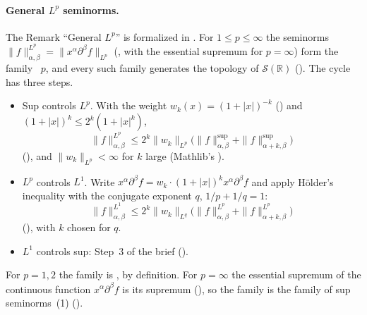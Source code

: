 \documentclass[11pt]{article}
\begin{document}
\paragraph{General $L^p$ seminorms.} The Remark ``General $L^p$'' is formalized in
. For $1 \le p \le \infty$ the seminorms
$\|f\|^{L^p}_{\alpha,\beta} = \|x^\alpha \partial^\beta f\|_{L^p}$ (, with the
essential supremum for $p = \infty$) form the family ~$p$, and every such family
generates the topology of $\mathcal{S}(\mathbb{R})$ (). The cycle has
three steps.
\begin{itemize}
\item Sup controls $L^p$. With the weight $w_k(x) = (1+|x|)^{-k}$ () and
  $(1+|x|)^k \le 2^k(1+|x|^k)$,
  \[
    \|f\|^{L^p}_{\alpha,\beta} \le 2^k \|w_k\|_{L^p}
      \bigl(\|f\|^{\sup}_{\alpha,\beta} + \|f\|^{\sup}_{\alpha+k,\beta}\bigr)
  \]
  (), and $\|w_k\|_{L^p} < \infty$ for $k$ large
  (Mathlib's ).
\item $L^p$ controls $L^1$. Write $x^\alpha \partial^\beta f = w_k \cdot (1+|x|)^k x^\alpha
  \partial^\beta f$ and apply Hölder's inequality with the conjugate exponent $q$,
  $1/p + 1/q = 1$:
  \[
    \|f\|^{L^1}_{\alpha,\beta} \le 2^k \|w_k\|_{L^q}
      \bigl(\|f\|^{L^p}_{\alpha,\beta} + \|f\|^{L^p}_{\alpha+k,\beta}\bigr)
  \]
  (), with $k$ chosen for $q$.
\item $L^1$ controls sup: Step~3 of the brief ().
\end{itemize}
For $p = 1, 2$ the family is ,  by definition. For $p = \infty$ the
essential supremum of the continuous function $x^\alpha \partial^\beta f$ is its supremum
(), so the family is the family of sup seminorms~(1)
().
\end{document}
